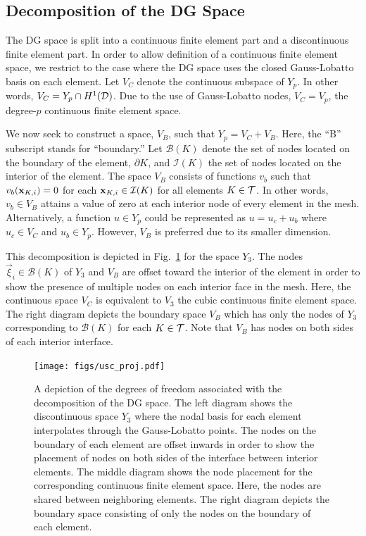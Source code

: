 \documentclass[../doc.tex]{subfiles}
\begin{document}
\subsection{Decomposition of the DG Space}
The DG space is split into a continuous finite element part and a discontinuous finite element part. In order to allow definition of a continuous finite element space, we restrict to the case where the DG space uses the closed Gauss-Lobatto basis on each element. Let $V_C$ denote the continuous subspace of $Y_p$. In other words, $V_C = Y_p \cap H^1(\mathcal{D})$. Due to the use of Gauss-Lobatto nodes, $V_C = V_p$, the degree-$p$ continuous finite element space. 

We now seek to construct a space, $V_B$, such that $Y_p = V_C + V_B$. Here, the ``B'' subscript stands for ``boundary.'' Let $\mathcal{B}(K)$ denote the set of nodes located on the boundary of the element, $\partial K$, and $\mathcal{I}(K)$ the set of nodes located on the interior of the element. The space $V_B$ consists of functions $v_b$ such that $v_b(\boldsymbol{\boldsymbol{\mathrm{x}}}_{K,i}) = 0$ for each $\boldsymbol{\boldsymbol{\mathrm{x}}}_{K,i} \in \mathcal{I}(K)$ for all elements $K \in \mathcal{T}$. In other words, $v_b \in V_B$ attains a value of zero at each interior node of every element in the mesh. 
Alternatively, a function $u \in Y_p$ could be represented as $u = u_c + u_b$ where $u_c \in V_C$ and $u_b \in Y_p$. However, $V_B$ is preferred due to its smaller dimension. 

This decomposition is depicted in Fig.~\ref{dgvef:usc_fes} for the space $Y_3$. The nodes $\vec{\xi}_i \in \mathcal{B}(K)$ of $Y_3$ and $V_B$ are offset toward the interior of the element in order to show the presence of multiple nodes on each interior face in the mesh. Here, the continuous space $V_C$ is equivalent to $V_3$ the cubic continuous finite element space. The right diagram depicts the boundary space $V_B$ which has only the nodes of $Y_3$ corresponding to $\mathcal{B}(K)$ for each $K \in \mathcal{T}$. Note that $V_B$ has nodes on both sides of each interior interface. 
\begin{figure}
\centering
\texttt{[image: figs/usc\_proj.pdf]}
\caption{A depiction of the degrees of freedom associated with the decomposition of the DG space. The left diagram shows the discontinuous space $Y_3$ where the nodal basis for each element interpolates through the Gauss-Lobatto points. The nodes on the boundary of each element are offset inwards in order to show the placement of nodes on both sides of the interface between interior elements. The middle diagram shows the node placement for the corresponding continuous finite element space. Here, the nodes are shared between neighboring elements. The right diagram depicts the boundary space consisting of only the nodes on the boundary of each element. }
\label{dgvef:usc_fes}
\end{figure}
\end{document}
